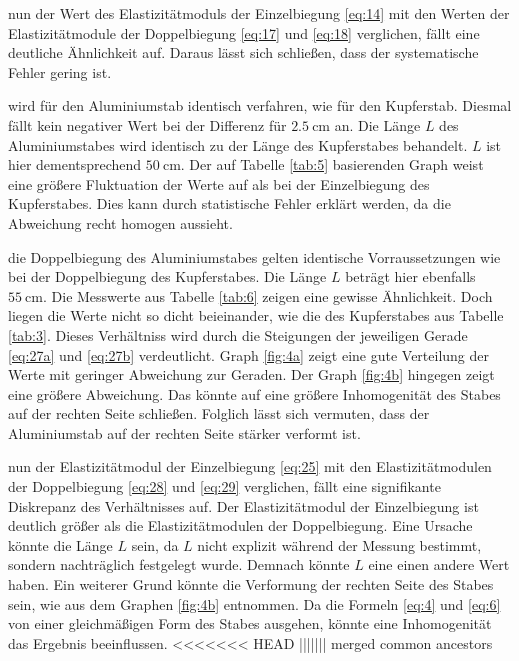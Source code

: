\justifying nun der Wert des Elastizitätmoduls der Einzelbiegung \eqref{eq:14} mit den Werten der Elastizitätmodule der Doppelbiegung \eqref{eq:17}
und \eqref{eq:18} verglichen, fällt eine deutliche Ähnlichkeit auf. Daraus lässt sich schließen, dass der systematische Fehler gering ist.


\justifying wird für den Aluminiumstab identisch verfahren, wie für den Kupferstab. 
Diesmal fällt kein negativer Wert bei der Differenz für 
$\SI{2.5}{\centi\meter}$ an. Die Länge $L$ des Aluminiumstabes wird identisch zu der Länge des Kupferstabes behandelt. $L$ ist hier dementsprechend
$\SI{50}{\centi\meter}$. Der auf Tabelle \ref{tab:5} basierenden Graph weist eine größere Fluktuation der Werte auf als bei der Einzelbiegung 
des Kupferstabes. Dies kann durch statistische Fehler erklärt werden, da die Abweichung recht homogen aussieht.

\justifying die Doppelbiegung des Aluminiumstabes gelten identische Vorraussetzungen wie bei der Doppelbiegung des Kupferstabes.
Die Länge $L$ beträgt hier ebenfalls $\SI{55}{\centi\meter}$. Die Messwerte aus Tabelle \ref{tab:6} zeigen eine gewisse Ähnlichkeit. Doch liegen 
die Werte nicht so dicht beieinander, wie die des Kupferstabes aus Tabelle \ref{tab:3}. Dieses Verhältniss wird durch die Steigungen der jeweiligen
Gerade \eqref{eq:27a} und \eqref{eq:27b} verdeutlicht. Graph \ref{fig:4a} zeigt eine gute Verteilung der Werte mit geringer Abweichung zur Geraden.
Der Graph \ref{fig:4b} hingegen zeigt eine größere Abweichung. Das könnte auf eine größere Inhomogenität des Stabes auf der rechten Seite schließen. 
Folglich lässt sich vermuten, dass der Aluminiumstab auf der rechten Seite stärker verformt ist. 

\justifying nun der Elastizitätmodul der Einzelbiegung \eqref{eq:25} mit den Elastizitätmodulen der Doppelbiegung \eqref{eq:28}
und \eqref{eq:29} verglichen, fällt eine signifikante Diskrepanz des Verhältnisses auf. Der Elastizitätmodul der Einzelbiegung ist deutlich größer
als die Elastizitätmodulen der Doppelbiegung. Eine Ursache könnte die Länge $L$ sein, da $L$ nicht explizit während der Messung bestimmt, sondern 
nachträglich festgelegt wurde. Demnach könnte $L$ eine einen andere Wert haben. Ein weiterer Grund könnte die Verformung der rechten Seite des Stabes
sein, wie aus dem Graphen \ref{fig:4b} entnommen. Da die Formeln \eqref{eq:4} und \eqref{eq:6} von einer gleichmäßigen Form des Stabes ausgehen, 
könnte eine Inhomogenität das Ergebnis beeinflussen.
<<<<<<< HEAD
||||||| merged common ancestors

